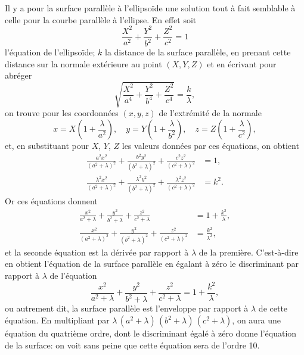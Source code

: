 \documentclass[11pt,a4paper]{article}
\theoremstyle{plain}
\theoremstyle{definition}
\begin{document}
Il y a pour la surface parall\`{e}le \`{a} l'ellipso\"{i}de une solution tout \`{a} fait semblable \`{a} celle pour la courbe parall\`{e}le \`{a} l'ellipse. En effet soit
\[
\frac{X^2}{a^2} + \frac{Y^2}{b^2} + \frac{Z^2}{c^2} = 1
\]
l'\'{e}quation de l'ellipso\"{i}de; $k$ la distance de la surface parall\`{e}le, en prenant cette distance sur la normale ext\'{e}rieure au point $(X, Y, Z)$ et en \'{e}crivant pour abr\'{e}ger
\[
\sqrt{\frac{X^2}{a^4} + \frac{Y^2}{b^4} + \frac{Z^2}{c^4}} = \frac{k}{\lambda},
\]
on trouve pour les coordonn\'{e}es $(x, y, z)$ de l'extr\'{e}mit\'{e} de la normale
\[
x = X\left(1 + \frac{\lambda}{a^2}\right), \quad y = Y\left(1 + \frac{\lambda}{b^2}\right), \quad z = Z\left(1 + \frac{\lambda}{c^2}\right),
\]
et, en substituant pour $X$, $Y$, $Z$ les valeurs donn\'{e}es par ces \'{e}quations, on obtient
\begin{align*}
\frac{a^2x^2}{(a^2+\lambda)^2} + \frac{b^2y^2}{(b^2+\lambda)^2} + \frac{c^2z^2}{(c^2+\lambda)^2} &= 1, \\
\frac{\lambda^2 x^2}{(a^2+\lambda)^2} + \frac{\lambda^2 y^2}{(b^2+\lambda)^2} + \frac{\lambda^2 z^2}{(c^2+\lambda)^2} &= k^2.
\end{align*}
Or ces \'{e}quations donnent
\begin{align*}
\frac{x^2}{a^2+\lambda} + \frac{y^2}{b^2+\lambda} + \frac{z^2}{c^2+\lambda} &= 1 + \frac{k^2}{\lambda}, \\
\frac{x^2}{(a^2+\lambda)^2} + \frac{y^2}{(b^2+\lambda)^2} + \frac{z^2}{(c^2+\lambda)^2} &= \frac{k^2}{\lambda^2},
\end{align*}
et la seconde \'{e}quation est la d\'{e}riv\'{e}e par rapport \`{a} $\lambda$ de la premi\`{e}re. C'est-\`{a}-dire en obtient l'\'{e}quation de la surface parall\`{e}le en \'{e}galant \`{a} z\'{e}ro le discriminant par rapport \`{a} $\lambda$ de l'\'{e}quation
\[
\frac{x^2}{a^2+\lambda} + \frac{y^2}{b^2+\lambda} + \frac{z^2}{c^2+\lambda} = 1 + \frac{k^2}{\lambda},
\]
ou autrement dit, la surface parall\`{e}le est l'enveloppe par rapport \`{a} $\lambda$ de cette \'{e}quation. En multipliant par $\lambda\,(a^2+\lambda)\,(b^2+\lambda)\,(c^2+\lambda)$, on aura une \'{e}quation du quatri\`{e}me ordre, dont le discriminant \'{e}gal\'{e} \`{a} z\'{e}ro donne l'\'{e}quation de la surface: on voit sans peine que cette \'{e}quation sera de l'ordre 10.
\end{document}
